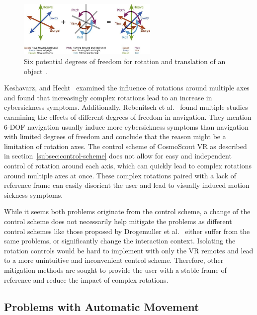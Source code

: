 \begin{figure}[h]
    \centering
    \includegraphics[width=0.6\textwidth]{content/3_current_state/img/6-DOF-reference[Fragaszy2018]}
    \caption{Six potential degrees of freedom for rotation and translation of an object~\cite{Fragaszy2018}.}
    \label{fig:6-dof-reference}
\end{figure}

Keshavarz, and Hecht~\cite{Keshavarz2011b} examined the influence of rotations around multiple axes and found that
increasingly complex rotations lead to an increase in cybersickness symptoms.
Additionally, Rebenitsch et al.~\cite{Rebenitsch2016} found multiple studies examining the effects of different
degrees of freedom in navigation.
They mention 6-DOF navigation usually induce more cybersickness symptoms than navigation with limited degrees of
freedom and conclude that the reason might be a limitation of rotation axes.
The control scheme of CosmoScout VR as described in section~\ref{subsec:control-scheme} does not allow for easy and
independent control of rotation around each axis, which can quickly lead to complex rotations around multiple axes at
once.
These complex rotations paired with a lack of reference frame can easily disorient the user and lead to visually
induced motion sickness symptoms.

While it seems both problems originate from the control scheme, a change of the control scheme does not necessarily
help mitigate the problems as different control schemes like those proposed by Drogemuller et al.~\cite{Drogemuller2020}
either suffer from the same problems, or significantly change the interaction context.
Isolating the rotation controls would be hard to implement with only the VR remotes and lead to a more unintuitive
and inconvenient control scheme.
Therefore, other mitigation methods are sought to provide the user with a stable frame of reference and reduce the
impact of complex rotations.


\subsection{Problems with Automatic Movement}\label{subsec:problems-with-automatic-movement}

